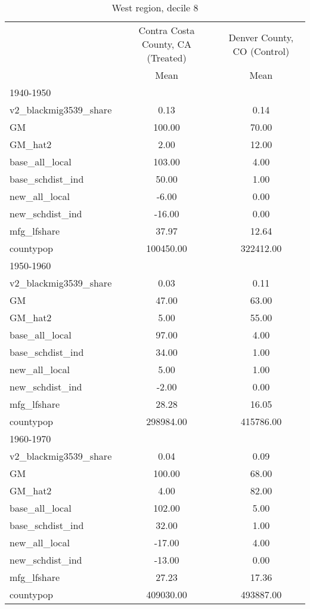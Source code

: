 \begin{table}[htbp]\centering
\def\sym#1{\ifmmode^{#1}\else\(^{#1}\)\fi}
\caption{West region, decile 8 \label{tab1}}
\begin{tabular}{l*{2}{c}}
\toprule
                    &\multicolumn{1}{c}{Contra Costa County, CA (Treated)}&\multicolumn{1}{c}{Denver County, CO (Control)}\\
                    &        Mean&        Mean\\
\midrule
1940-1950           &            &            \\
v2\_blackmig3539\_share&        0.13&        0.14\\
GM                  &      100.00&       70.00\\
GM\_hat2             &        2.00&       12.00\\
base\_all\_local      &      103.00&        4.00\\
base\_schdist\_ind    &       50.00&        1.00\\
new\_all\_local       &       -6.00&        0.00\\
new\_schdist\_ind     &      -16.00&        0.00\\
mfg\_lfshare         &       37.97&       12.64\\
countypop           &   100450.00&   322412.00\\
\midrule
1950-1960           &            &            \\
v2\_blackmig3539\_share&        0.03&        0.11\\
GM                  &       47.00&       63.00\\
GM\_hat2             &        5.00&       55.00\\
base\_all\_local      &       97.00&        4.00\\
base\_schdist\_ind    &       34.00&        1.00\\
new\_all\_local       &        5.00&        1.00\\
new\_schdist\_ind     &       -2.00&        0.00\\
mfg\_lfshare         &       28.28&       16.05\\
countypop           &   298984.00&   415786.00\\
\midrule
1960-1970           &            &            \\
v2\_blackmig3539\_share&        0.04&        0.09\\
GM                  &      100.00&       68.00\\
GM\_hat2             &        4.00&       82.00\\
base\_all\_local      &      102.00&        5.00\\
base\_schdist\_ind    &       32.00&        1.00\\
new\_all\_local       &      -17.00&        4.00\\
new\_schdist\_ind     &      -13.00&        0.00\\
mfg\_lfshare         &       27.23&       17.36\\
countypop           &   409030.00&   493887.00\\
\bottomrule
\end{tabular}
\end{table}

